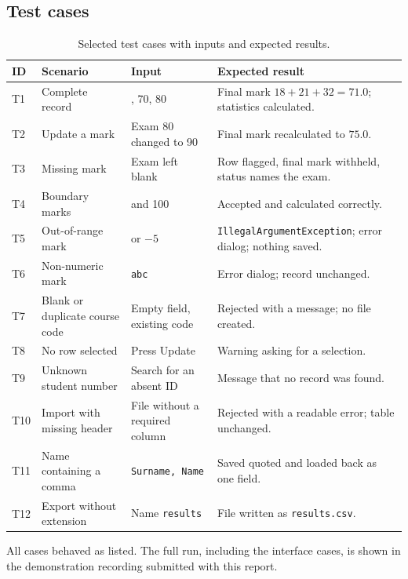 \subsection{Test cases}
\begin{table}[htbp]
\centering
\small
\renewcommand{\arraystretch}{1.1}
\caption{Selected test cases with inputs and expected results.}
\label{tab:tests}
\begin{tabularx}{\textwidth}{@{}l >{\raggedright\arraybackslash}p{3.7cm} >{\raggedright\arraybackslash}p{3.3cm} X@{}}
\toprule
\textbf{ID} & \textbf{Scenario} & \textbf{Input} & \textbf{Expected result}\\
\midrule
T1 & Complete record & 60, 70, 80 & Final mark $18+21+32 = 71.0$; statistics calculated.\\
T2 & Update a mark & Exam 80 changed to 90 & Final mark recalculated to $75.0$.\\
T3 & Missing mark & Exam left blank & Row flagged, final mark withheld, status names the exam.\\
T4 & Boundary marks & 0 and 100 & Accepted and calculated correctly.\\
T5 & Out-of-range mark & 105 or $-5$ & \texttt{IllegalArgumentException}; error dialog; nothing saved.\\
T6 & Non-numeric mark & \texttt{abc} & Error dialog; record unchanged.\\
T7 & Blank or duplicate course code & Empty field, existing code & Rejected with a message; no file created.\\
T8 & No row selected & Press Update & Warning asking for a selection.\\
T9 & Unknown student number & Search for an absent ID & Message that no record was found.\\
T10 & Import with missing header & File without a required column & Rejected with a readable error; table unchanged.\\
T11 & Name containing a comma & \texttt{Surname, Name} & Saved quoted and loaded back as one field.\\
T12 & Export without extension & Name \texttt{results} & File written as \texttt{results.csv}.\\
\bottomrule
\end{tabularx}
\end{table}

All cases behaved as listed. The full run, including the interface cases, is shown in the demonstration recording submitted with this report.

